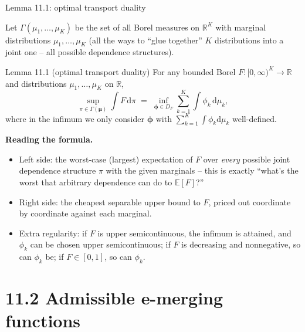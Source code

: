 \documentclass[aspectratio=169,10pt]{beamer}
\newcommand{\EE}{\mathbb{E}}
\newcommand{\RR}{\mathbb{R}}
\newcommand{\1}{\mathbb{1}}
\begin{document}
\begin{frame}[allowframebreaks]{Lemma 11.1: optimal transport duality}

Let $\Gamma(\mu_1,\dots,\mu_K)$ be the set of all Borel measures on $\RR^K$ with marginal distributions $\mu_1,\dots,\mu_K$ (all the ways to ``glue together'' $K$ distributions into a joint one -- all possible dependence structures).

\begin{block}{Lemma 11.1 (optimal transport duality)}
For any bounded Borel $F:[0,\infty)^K \to \RR$ and distributions $\mu_1,\dots,\mu_K$ on $\RR$,
\[
\sup_{\pi \in \Gamma(\boldsymbol\mu)} \int F \, \mathrm{d}\pi \;=\; \inf_{\boldsymbol\phi \in D_F} \sum_{k=1}^K \int \phi_k \, \mathrm{d}\mu_k,
\tag{11.1}
\]
where in the infimum we only consider $\boldsymbol\phi$ with $\sum_{k=1}^K \int \phi_k \mathrm{d}\mu_k$ well-defined.
\end{block}

\textbf{Reading the formula.}
\begin{itemize}
\item Left side: the worst-case (largest) expectation of $F$ over \emph{every} possible joint dependence structure $\pi$ with the given marginals -- this is exactly ``what's the worst that arbitrary dependence can do to $\EE[F]$?''
\item Right side: the cheapest separable upper bound to $F$, priced out coordinate by coordinate against each marginal.
\item Extra regularity: if $F$ is upper semicontinuous, the infimum is attained, and $\phi_k$ can be chosen upper semicontinuous; if $F$ is decreasing and nonnegative, so can $\phi_k$ be; if $F\in[0,1]$, so can $\phi_k$.
\end{itemize}

\end{frame}

\section{11.2 Admissible e-merging functions}
\end{document}
